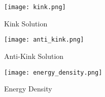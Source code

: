\begin{figure}[H]
    \centering
    \texttt{[image: kink.png]}
    \caption{Kink Solution}
    \label{fig:q2_kink}
\end{figure}

\begin{figure}[H]
    \centering
    \texttt{[image: anti\_kink.png]}
    \caption{Anti-Kink Solution}
    \label{fig:q2_anti_kink}
\end{figure}

\begin{figure}[H]
    \centering
    \texttt{[image: energy\_density.png]}
    \caption{Energy Density}
    \label{fig:q2_anti_kink}
\end{figure}
